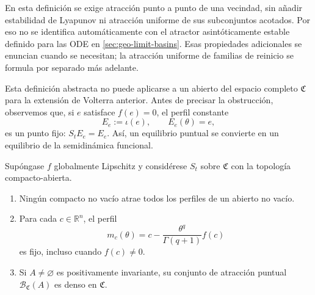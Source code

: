 En esta definición se exige atracción punto a punto de una vecindad, sin
añadir estabilidad de Lyapunov ni atracción uniforme de sus subconjuntos
acotados. Por eso no se identifica automáticamente con el atractor
asintóticamente estable definido para las ODE en
\cref{sec:geo-limit-basins}. Esas propiedades adicionales se enuncian cuando
se necesitan; la atracción uniforme de familias de reinicio se formula por
separado más adelante.

Esta definición abstracta no puede aplicarse a un abierto del espacio completo
\(\mathfrak C\) para la extensión de Volterra anterior. Antes de precisar
la obstrucción, observemos que, si \(e\) satisface
\(f(e)=0\), el perfil constante
\begin{equation}
 E_e:=\iota(e),\qquad E_e(\theta)=e,
 \label{eq:geofo-equilibrium-profile}
\end{equation}
es un punto fijo: \(S_tE_e=E_e\). Así, un equilibrio puntual se convierte en
un equilibrio de la semidinámica funcional.

\begin{proposition}
\label{prop:geofo-full-space-obstruction}
Supóngase \(f\) globalmente Lipschitz y considérese \(S_t\) sobre
\(\mathfrak C\) con la topología compacto-abierta.
\begin{enumerate}
 \item Ningún compacto no vacío atrae todos los perfiles de un abierto no vacío.
 \item Para cada \(c\in\mathbb R^n\), el perfil
 \begin{equation}
  m_c(\theta)=c-\frac{\theta^q}{\Gamma(q+1)}f(c)
  \label{eq:geofo-artificial-fixed-profile}
 \end{equation}
 es fijo, incluso cuando \(f(c)\ne0\).
 \item Si \(A\ne\varnothing\) es positivamente invariante, su conjunto
 de atracción puntual \(\mathcal B_{\mathfrak C}(A)\) es denso en
 \(\mathfrak C\).
\end{enumerate}
\end{proposition}

